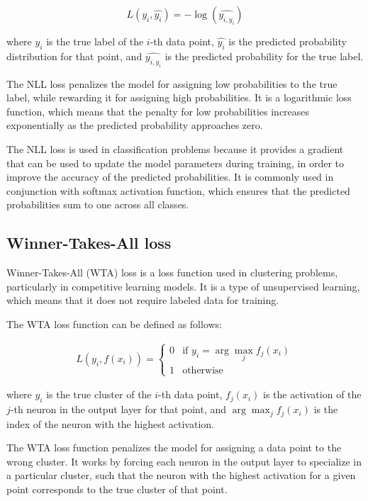 \begin{equation}
	L(y_i, \hat{y_i}) = -\log(\hat{y_{i,y_i}})
\end{equation}

where $y_i$ is the true label of the $i$-th data point, $\hat{y_i}$ is the predicted probability distribution for that point, and $\hat{y_{i,y_i}}$ is the predicted probability for the true label.

The NLL loss penalizes the model for assigning low probabilities to the true label, while rewarding it for assigning high probabilities. It is a logarithmic loss function, which means that the penalty for low probabilities increases exponentially as the predicted probability approaches zero.

The NLL loss is used in classification problems because it provides a gradient that can be used to update the model parameters during training, in order to improve the accuracy of the predicted probabilities. It is commonly used in conjunction with softmax activation function, which ensures that the predicted probabilities sum to one across all classes.

\subsection{Winner-Takes-All loss}
\label{subsec:3_WTA_loss}

Winner-Takes-All (WTA) loss is a loss function used in clustering problems, particularly in competitive learning models. It is a type of unsupervised learning, which means that it does not require labeled data for training.

The WTA loss function can be defined as follows:

\begin{equation}
\begin{split}
	L(y_i, f(x_i)) = \begin{cases}
		0 & \text{if } y_i = \arg\max_j f_j(x_i) \\
		1 & \text{otherwise} \
	\end{cases}
\end{split}
\end{equation}

where $y_i$ is the true cluster of the $i$-th data point, $f_j(x_i)$ is the activation of the $j$-th neuron in the output layer for that point, and $\arg\max_j f_j(x_i)$ is the index of the neuron with the highest activation.

The WTA loss function penalizes the model for assigning a data point to the wrong cluster. It works by forcing each neuron in the output layer to specialize in a particular cluster, such that the neuron with the highest activation for a given point corresponds to the true cluster of that point.

